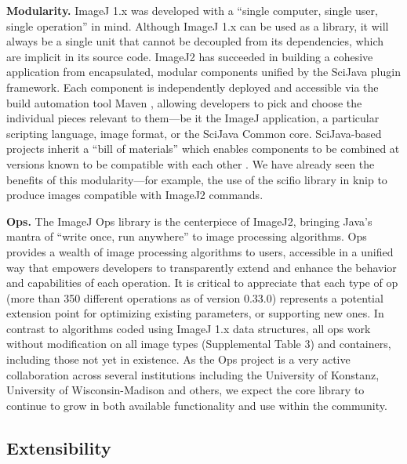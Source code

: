 \documentclass{bmcart}
\begin{document}
\textbf{Modularity.} ImageJ 1.x was developed with a ``single computer, single
user, single operation'' in mind. Although ImageJ 1.x can be used as a library,
it will always be a single unit that cannot be decoupled from its dependencies,
which are implicit in its source code. ImageJ2 has succeeded in building a
cohesive application from encapsulated, modular components unified by the
SciJava plugin framework. Each component is independently deployed and
accessible via the build automation tool Maven \cite{apache_maven}, allowing
developers to pick and choose the individual pieces relevant to them---be it
the ImageJ application, a particular scripting language, image format, or the
SciJava Common core. SciJava-based projects inherit a ``bill of materials''
which enables components to be combined at versions known to be compatible with
each other \cite{imagej_architecture}. We have already seen the benefits of
this modularity---for example, the use of the \acrshort{scifio} library in
\acrfull{knip} to produce images compatible with ImageJ2 commands.

\textbf{Ops.} The ImageJ Ops library is the centerpiece of ImageJ2, bringing
Java's mantra of ``write once, run anywhere'' to image processing algorithms.
Ops provides a wealth of image processing algorithms to users, accessible in a
unified way that empowers developers to transparently extend and enhance the
behavior and capabilities of each operation. It is critical to appreciate that
each type of op (more than 350 different operations as of version 0.33.0)
represents a potential extension point for optimizing existing parameters, or
supporting new ones. In contrast to algorithms coded using ImageJ 1.x data
structures, all ops work without modification on all image types (Supplemental
Table 3) and containers, including those not yet in existence. As the Ops
project is a very active collaboration across several institutions including
the University of Konstanz, University of Wisconsin-Madison and others, we
expect the core library to continue to grow in both available functionality and
use within the community.

\subsection*{Extensibility}
\end{document}
